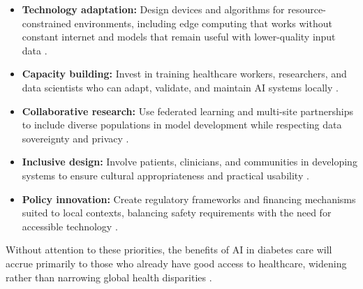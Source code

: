 \begin{itemize}
    \item \textbf{Technology adaptation:} Design devices and algorithms for resource-constrained environments, including edge computing that works without constant internet and models that remain useful with lower-quality input data \cite{fahmy2025exploring, ghosh2025artificial, zhu2024population}.
    \item \textbf{Capacity building:} Invest in training healthcare workers, researchers, and data scientists who can adapt, validate, and maintain AI systems locally \cite{mackenzie2023diabetes, bahmani2025achieving}.
    \item \textbf{Collaborative research:} Use federated learning and multi-site partnerships to include diverse populations in model development while respecting data sovereignty and privacy \cite{bai2024federated, fahmy2025exploring, raj2024federated}.
    \item \textbf{Inclusive design:} Involve patients, clinicians, and communities in developing systems to ensure cultural appropriateness and practical usability \cite{mackenzie2023diabetes, bahmani2025achieving}.
    \item \textbf{Policy innovation:} Create regulatory frameworks and financing mechanisms suited to local contexts, balancing safety requirements with the need for accessible technology \cite{mackenzie2023diabetes, khalifa2024artificial}.
\end{itemize}

Without attention to these priorities, the benefits of AI in diabetes care will accrue primarily to those who already have good access to healthcare, widening rather than narrowing global health disparities \cite{fahmy2025exploring, wang2024ai, haider2024algorithmic}.
